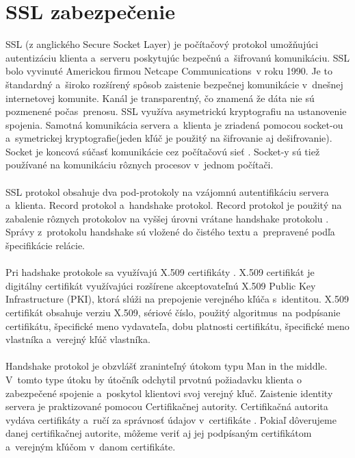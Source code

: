 \documentclass[
  digital, %
  table,   %
oneside,
  nolof,     %
  nolot,     %
]{fithesis3}
\begin{document}
\section{SSL zabezpečenie}
SSL (z anglického Secure Socket Layer) \cite{ssl}\cite{sslOnline} je počítačový protokol umožňujúci autentizáciu  klienta a~serveru  poskytujúc  bezpečnú a~šifrovanú komunikáciu. SSL bolo vyvinuté Americkou firmou Netcape Communications~v roku 1990. Je to štandardný a~široko rozšírený spôsob zaistenie bezpečnej komunikácie v~dnešnej internetovej komunite. Kanál je transparentný, čo znamená že dáta nie sú pozmenené počas~prenosu. SSL využíva asymetrickú kryptografiu  na ustanovenie spojenia. Samotná komunikácia servera a~klienta je zriadená pomocou socket-ou a~symetrickej kryptografie(jeden kľúč je použitý na šifrovanie aj dešifrovanie). Socket je koncová súčasť komunikácie cez počítačovú sieť \cite{networkSocket}. Socket-y sú tiež používané na komunikáciu rôznych procesov v~jednom počítači. \paragraph{}
SSL protokol obsahuje dva pod-protokoly na vzájomnú autentifikáciu servera a~klienta. Record protokol a~handshake protokol. Record protokol je použitý na zabalenie rôznych protokolov na vyššej úrovni vrátane handshake protokolu \cite{ssl3.0}. Správy z~protokolu handshake  sú vložené do čistého textu a~prepravené podľa špecifikácie relácie. \paragraph{}
Pri hadshake protokole sa využívajú X.509 certifikáty \cite{x509cert}. X.509 certifikát je digitálny certifikát využívajúci rozšírene akceptovateľnú X.509 Public Key Infrastructure (PKI), ktorá slúži na prepojenie verejného kľúča s~identitou.  X.509 certifikát obsahuje verziu X.509, sériové číslo, použitý algoritmus~na podpísanie certifikátu, špecifické meno vydavateľa, dobu platnosti certifikátu, špecifické meno vlastníka a~verejný kľúč vlastníka.  
\paragraph{}
Handshake protokol je obzvlášť zraninteľný  útokom typu Man in the middle. V~tomto type útoku by útočník odchytil prvotnú požiadavku klienta o zabezpečené spojenie a~poskytol klientovi svoj verejný kľuč. Zaistenie identity servera je praktizované pomocou Certifikačnej autority.  Certifikačná autorita vydáva certifikáty a~ručí za správnosť údajov v~certifikáte \cite{certificateAuth}. Pokiaľ dôverujeme danej certifikačnej autorite, môžeme veriť aj jej podpísaným certifikátom  a~verejným kľúčom v~danom certifikáte. 
\end{document}
